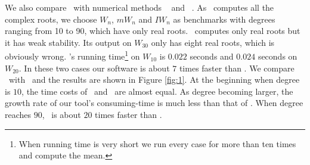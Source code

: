   We also compare \froot\  with numerical methods  \eign\ \cite{eigsolev} and \sle\ \cite{hemmer09}. As \eign\ computes all the complex roots, we choose $W_n$, $mW_n$ and $IW_n$ as benchmarks with degrees ranging from 10 to 90, which have only real roots. \sle\ computes only real roots but it has weak stability. Its output on $W_{30}$ only has eight real roots, which is obviously wrong. \sle's running time\footnote{When  running time is very short we run every case for more than ten times and compute the mean.} on $W_{10}$ is $0.022$ seconds and
 $0.024$ seconds on $W_{20}$. In these two cases our software is about $7$ times faster than \sle. We compare \froot\ with  \eign\ and the results are  shown in Figure \ref{fig:1}.
 At the beginning when degree is $10$, the time costs of \froot\ and \eign\ are
 almost equal. As degree becoming larger, the growth rate of our tool's consuming-time is much less than that of  \eign.  When degree reaches $90$, \froot\ is about $20$ times faster than \eign.


